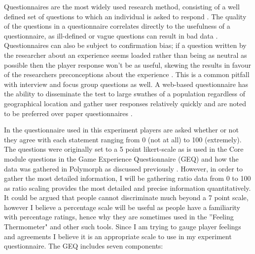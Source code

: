 \documentclass[journal]{IEEEtran}
\begin{document}
Questionnaires are the most widely used research method, consisting of a well defined set of questions to which an individual is asked to respond \cite{goddard2006designing}. The quality of the questions in a questionnaire correlates directly to the usefulness of a questionnaire, as ill-defined or vague questions can result in bad data \cite{litwin1995measure}. Questionnaires can also be subject to confirmation bias; if a question written by the researcher about an experience seems loaded rather than being as neutral as possible then the player response won't be as useful, skewing the results in favour of the researchers preconceptions about the experience \cite{fowler1995improving}. This is a common pitfall with interview and focus group questions as well. A web-based questionnaire has the ability to disseminate the test to large swathes of a population regardless of geographical location and gather user responses relatively quickly and are noted to be preferred over paper questionnaires \cite{evans2005value}.

In the questionnaire used in this experiment players are asked whether or not they agree with each statement ranging from 0 (not at all) to 100 (extremely). The questions were originally set to a 5 point likert-scale as is used in the Core module questions in the Game Experience Questionnaire (GEQ) \cite{ijsselsteijn2013game} \cite{poels2007d3} and how the data was gathered in Polymorph as discussed previously \cite{jennings2010polymorph}. However, in order to gather the most detailed information, I will be gathering ratio data from 0 to 100 as ratio scaling provides the most detailed and precise information quantitatively. It could be argued that people cannot discriminate much beyond a 7 point scale, however I believe a percentage scale will be useful as people have a familiarity with percentage ratings, hence why they are sometimes used in the ''Feeling Thermometer" and other such tools. Since I am trying to gauge player feelings and agreements I believe it is an appropriate scale to use in my experiment questionnaire. The GEQ includes seven components: 

\end{document}
